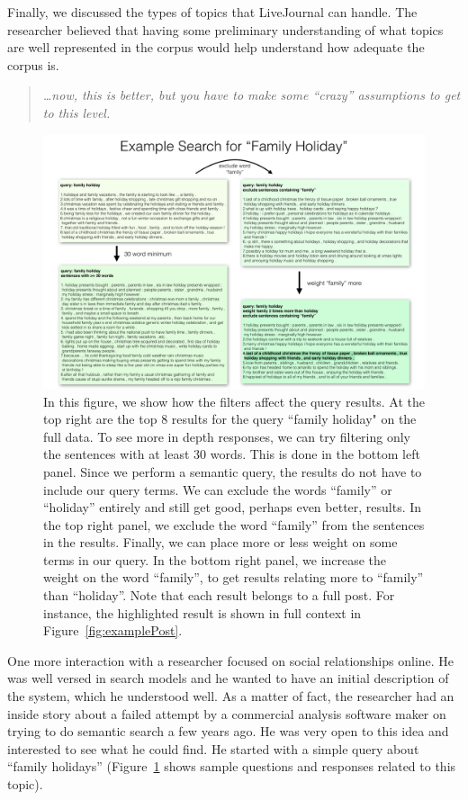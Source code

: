 \documentclass{sigchi}
\begin{document}
Finally, we discussed the types of topics that LiveJournal can handle. The researcher believed that having some preliminary understanding of what topics are well represented in the corpus would help understand how adequate the corpus is. 

\begin{quote}
{\em
\dots now, this is better, but you have to make some ``crazy'' assumptions to get to this level.
}\end{quote}


\begin{figure}[ht]
\centering \includegraphics[width=.85\textwidth]{figures/results_1}
\caption{In this figure, we show how the filters affect the query results. 
At the top right are the top 8 results for the query ``family holiday" on the full data.  
To see more in depth responses, we can try filtering only the sentences with at least 30 words. 
This is done in the bottom left panel. 
Since we perform a semantic query, the results do not have to include our query terms. 
We can exclude the words ``family'' or ``holiday''  entirely and still get good, perhaps even better, results.
In the top right panel, we exclude the word ``family'' from the sentences in the results.
Finally, we can place more or less weight on some terms in our query. 
In the bottom right panel, we increase the weight on the word ``family'', 
to get results relating more to ``family'' than ``holiday''.  
Note that each result belongs to a full post. For instance, the highlighted result is shown in full context in Figure~\ref{fig:examplePost}. 
\label{fig:familyHolidays} }
\end{figure}

One more interaction with a researcher focused on social relationships online. He was well versed in search models and he wanted to have an initial description of the system, which he understood well. As a matter of fact, the researcher had an inside story about a failed attempt by a commercial analysis software maker on trying to do semantic search a few years ago. He was very open to this idea and interested to see what he could find. He started with a simple query about ``family holidays'' (Figure~\ref{fig:familyHolidays} shows sample questions and responses related to this topic).
\end{document}
